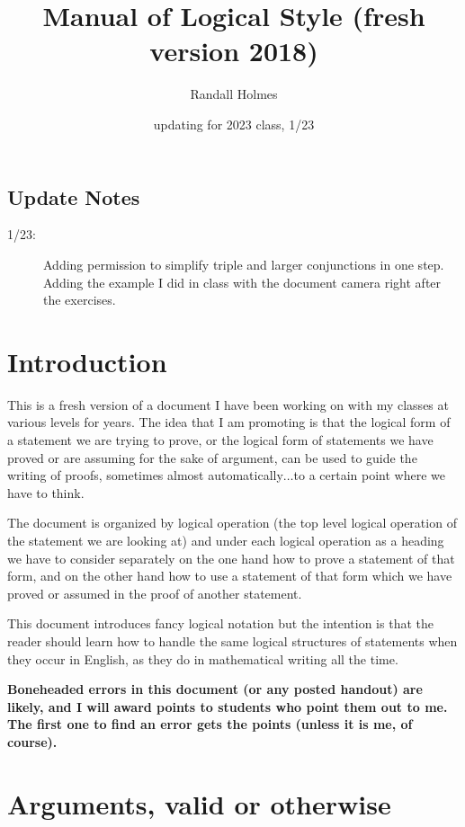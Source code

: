 \documentclass[12pt]{article}
\title{Manual of Logical Style (fresh version 2018)}
\author{Randall Holmes}
\date{updating for 2023 class, 1/23}
\begin{document}
\maketitle

\subsection{Update Notes}

\begin{description}

\item[1/23:]  Adding permission to simplify triple and larger conjunctions in one step.  Adding the example I did in class with the document camera right after the exercises.

\end{description}

\section{Introduction}

This is a fresh version of a document I have been working on with my classes at various levels for years.  The idea that I am promoting is that the logical form of a statement we are trying to prove, or the logical form of statements we have proved or are assuming for the sake of argument, can be used to guide the writing of proofs, sometimes almost automatically$\ldots$to a certain point where we have to think.

The document is organized by logical operation (the top level logical operation of the statement we are looking at) and under each logical operation as a heading we have to consider separately on the one hand how to prove a statement of that form, and on the other hand how to use a statement of that form which we have proved or assumed in the proof of another statement.

This document introduces fancy logical notation but the intention is that the reader should learn how to handle the same logical structures of statements when they occur in English, as they do in mathematical writing all the time.

{\bf Boneheaded errors in this document (or any posted handout) are likely, and I will award points to students who point them out to me.  The first one to find an error gets the points (unless it is me, of course).}

\section{Arguments, valid or otherwise}
\end{document}
